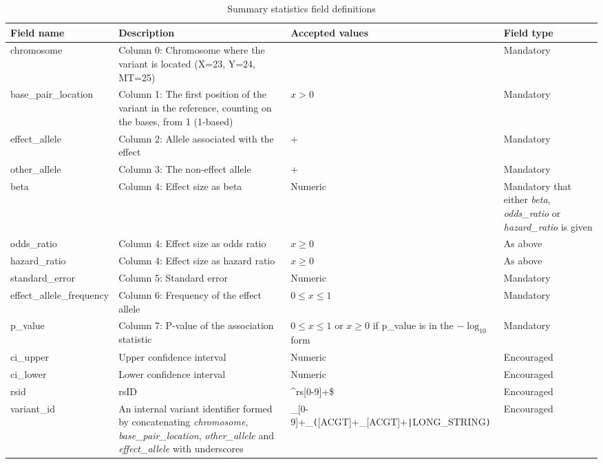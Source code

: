 \documentclass[11pt]{article}
\begin{document}
\begin{landscape}
\begin{table}[h]
 \begin{threeparttable}
  \caption{Summary statistics field definitions}
  \centering
  \small
  \begin{tabularx}{\linewidth} { 
    | >{\hsize=0.7\hsize\centering\arraybackslash}X 
    | >{\hsize=1\hsize\centering\arraybackslash}X 
    | >{\hsize=1.9\hsize\centering\arraybackslash}X 
    | >{\hsize=0.4\hsize\centering\arraybackslash}X | } 
   \hline
   Field name & Description & Accepted values & Field type \\
   \hline
   chromosome & Column 0: Chromosome where the variant is located (X=23, Y=24, MT=25) & [1-25] & Mandatory\\
   base\_pair\_location & Column 1: The first position of the variant in the reference, counting on the bases, from 1 (1-based) & $x > 0$ & Mandatory\\
   effect\_allele & Column 2: Allele associated with the effect & [ACGT]+ & Mandatory\\
   other\_allele & Column 3: The non-effect allele & [ACGT]+ & Mandatory\\
   beta & Column 4: Effect size as beta & Numeric & Mandatory that either \textit{beta}, \textit{odds\_ratio} or \textit{hazard\_ratio} is given\\
   odds\_ratio & Column 4: Effect size as odds ratio & $x \ge 0$ & As above\\
   hazard\_ratio & Column 4: Effect size as hazard ratio & $x \ge 0$ & As above\\
   standard\_error & Column 5: Standard error & Numeric & Mandatory\\
   effect\_allele\_frequency & Column 6: Frequency of the effect allele & $0 \le x \le 1$\tnote{b} & Mandatory\\
   p\_value & Column 7: P-value of the association statistic & $0 \le x \le 1$ or $x \ge 0$ if p\_value is in the $-\log_{10}$ form\tnote{a} & Mandatory \\
   ci\_upper & Upper confidence interval & Numeric & Encouraged\\
   ci\_lower & Lower confidence interval & Numeric & Encouraged\\
   rsid & rsID & \^{}rs[0-9]+\$ & Encouraged\\
   variant\_id & An internal variant identifier formed by concatenating \textit{chromosome}, \textit{base\_pair\_location}, \textit{other\_allele} and \textit{effect\_allele} with underscores & [1-25]\_[0-9]+\_\texttt{(}[ACGT]+\_[ACGT]+\texttt{|}LONG\_STRING\texttt{)}\tnote{c} & Encouraged\\

\end{tabularx}
\end{threeparttable}
\end{table}
\end{landscape}
\end{document}
